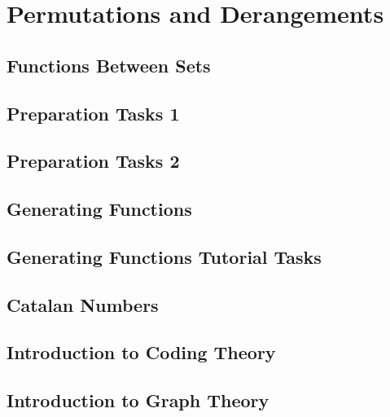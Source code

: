 \documentclass{article}
\newcommand{\includelectureSub}[1]{%
  \begingroup
    \renewcommand{\section}{\subsection}%
  \endgroup
}
\newcommand{\includelectureNoHeader}[1]{%
  \begingroup
    \let\maketitle\relax%
  \endgroup
}
\begin{document}
\section{Permutations and Derangements}
\includelectureSub{Permutations_Derangements}

\section{Functions Between Sets}
\includelectureNoHeader{Functions_between_sets}

\section{Preparation Tasks 1}
\includelectureSub{Preparation_tasks1}

\section{Preparation Tasks 2}
\includelectureSub{Preparation_tasks2}

\section{Generating Functions}
\includelectureSub{Generating_functions}

\section{Generating Functions Tutorial Tasks}
\includelectureSub{Generating_functions_tutorial}

\section{Catalan Numbers}
\includelectureSub{Catalan_Numbers}

\section{Introduction to Coding Theory}
\includelectureSub{Codes}

\section{Introduction to Graph Theory}
\includelectureSub{Graphs}
\end{document}
